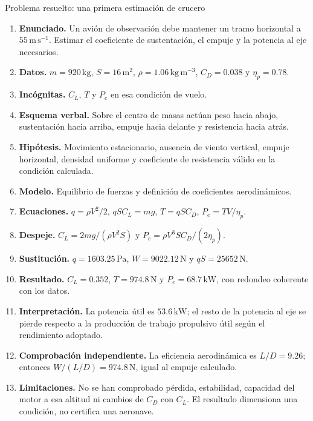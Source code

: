 \begin{studiumworked}{Problema resuelto: una primera estimación de crucero}

\begin{enumerate}
\item \textbf{Enunciado.} Un avión de observación debe mantener un tramo horizontal a $55\,\mathrm{m\,s^{-1}}$. Estimar el coeficiente de sustentación, el empuje y la potencia al eje necesarios.
\item \textbf{Datos.} $m=920\,\mathrm{kg}$, $S=16\,\mathrm{m^2}$, $\rho=1.06\,\mathrm{kg\,m^{-3}}$, $C_D=0.038$ y $\eta_p=0.78$.
\item \textbf{Incógnitas.} $C_L$, $T$ y $P_e$ en esa condición de vuelo.
\item \textbf{Esquema verbal.} Sobre el centro de masas actúan peso hacia abajo, sustentación hacia arriba, empuje hacia delante y resistencia hacia atrás.
\item \textbf{Hipótesis.} Movimiento estacionario, ausencia de viento vertical, empuje horizontal, densidad uniforme y coeficiente de resistencia válido en la condición calculada.
\item \textbf{Modelo.} Equilibrio de fuerzas y definición de coeficientes aerodinámicos.
\item \textbf{Ecuaciones.} $q=\rho V^2/2$, $qSC_L=mg$, $T=qSC_D$, $P_e=TV/\eta_p$.
\item \textbf{Despeje.} $C_L=2mg/(\rho V^2S)$ y $P_e=\rho V^3SC_D/(2\eta_p)$.
\item \textbf{Sustitución.} $q=1603.25\,\mathrm{Pa}$, $W=9022.12\,\mathrm{N}$ y $qS=25652\,\mathrm{N}$.
\item \textbf{Resultado.} $C_L=0.352$, $T=974.8\,\mathrm{N}$ y $P_e=68.7\,\mathrm{kW}$, con redondeo coherente con los datos.
\item \textbf{Interpretación.} La potencia útil es $53.6\,\mathrm{kW}$; el resto de la potencia al eje se pierde respecto a la producción de trabajo propulsivo útil según el rendimiento adoptado.
\item \textbf{Comprobación independiente.} La eficiencia aerodinámica es $L/D=9.26$; entonces $W/(L/D)=974.8\,\mathrm{N}$, igual al empuje calculado.
\item \textbf{Limitaciones.} No se han comprobado pérdida, estabilidad, capacidad del motor a esa altitud ni cambios de $C_D$ con $C_L$. El resultado dimensiona una condición, no certifica una aeronave.
\end{enumerate}


\end{studiumworked}

